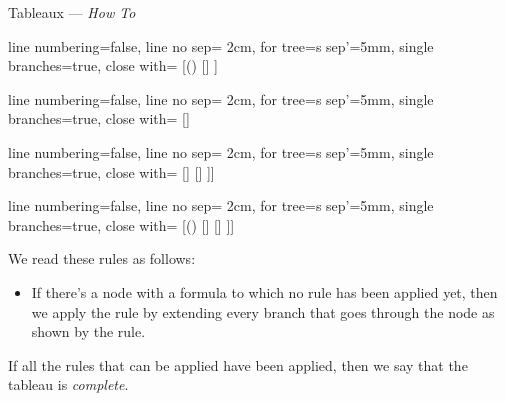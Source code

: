 \begin{frame}{Tableaux --- \emph{How To}}
\begin{enumerate}
\begin{center}
{					\begin{prooftree}
					{
					line numbering=false,
					line no sep= 2cm,
					for tree={s sep'=5mm},
					single branches=true,
					close with=\xmark
					}
					[\neg (\phi\to\psi) [\phi [\neg \psi ] ] ]
					\end{prooftree}
					\begin{prooftree}
					{
					line numbering=false,
					line no sep= 2cm,
					for tree={s sep'=5mm},
					single branches=true,
					close with=\xmark
					}
					[\phi\to\psi [\neg \phi ] [\psi ] ]
					\end{prooftree}
					\begin{prooftree}
					{
					line numbering=false,
					line no sep= 2cm,
					for tree={s sep'=5mm},
					single branches=true,
					close with=\xmark
					}
					[\phi\leftrightarrow \psi [\phi [\psi] ] [\neg \phi [\neg \psi] ] ]]
					\end{prooftree}
					\begin{prooftree}
					{
					line numbering=false,
					line no sep= 2cm,
					for tree={s sep'=5mm},
					single branches=true,
					close with=\xmark
					}
					[\neg(\phi\leftrightarrow \psi) [\phi [\neg \psi] ] [\neg \phi [ \psi] ] ]]
					\end{prooftree}}

				\end{center}
			We read these rules as follows:
			
				\begin{itemize}
		
			\item If there's a node with a formula to which no rule has been applied yet, then we apply the rule by extending every branch that goes through the node as shown by the rule.
			
			\end{itemize}
			
			 If all the rules that can be applied have been applied, then we say that the tableau is \emph{complete}.
	
	\end{enumerate}

\end{frame}

